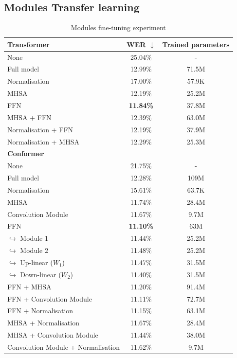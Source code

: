 \subsection{Modules Transfer learning}
\begin{table}
    \begin{center}
        \begin{tabular}{lcc}\hline
            \textbf{Transformer}    & WER  $\downarrow$   & Trained parameters \\ \hline
            None & 25.04\% & -   \\
            Full model   & 12.99\% & 71.5M   \\ \hline
            Normalisation & 17.00\% & 57.9K  \\
            MHSA & 12.19\% & 25.2M  \\
            FFN    & \textbf{11.84\%}     &  37.8M \\ \hline
            MHSA + FFN & 12.39\% & 63.0M \\
            Normalisation + FFN & 12.19\% & 37.9M \\
            Normalisation + MHSA & 12.29\% & 25.3M\\ \hline \hline
            \textbf{Conformer}    &     & \\ \hline
            None & 21.75\% & -   \\
            Full model   & 12.28\% & 109M   \\ \hline
            Normalisation & 15.61\% & 63.7K  \\
            MHSA & 11.74\% & 28.4M  \\
            Convolution Module & 11.67\% & 9.7M \\
            FFN    & \textbf{11.10\%}     &  63M \\
            \quad $\hookrightarrow$ Module 1    & 11.44\%     &  25.2M \\
            \quad $\hookrightarrow$ Module 2    & 11.48\%     &  25.2M \\
            \quad $\hookrightarrow$ Up-linear ($W_1$)    & 11.47\%     &  31.5M \\
            \quad $\hookrightarrow$ Down-linear ($W_2$)    & 11.40\%     &  31.5M \\ \hline
            FFN + MHSA & 11.20\% & 91.4M \\
            FFN + Convolution Module & 11.11\% & 72.7M \\
            FFN + Normalisation & 11.15\% & 63.1M \\
            MHSA + Normalisation & 11.67\% & 28.4M \\
            MHSA + Convolution Module & 11.44\% & 38.0M \\
            Convolution Module + Normalisation & 11.62\% & 9.7M\\ \hline
        \end{tabular}
    \end{center}
    \caption{Modules fine-tuning experiment}
    \label{table:ModulesTL}
\end{table}
